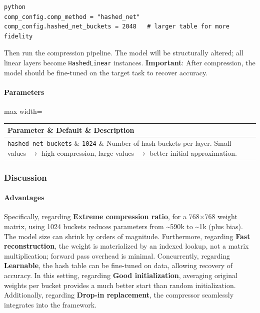 \vspace{0.5em}
\begin{mdframed}[backgroundcolor=codebg, linecolor=codeframe, linewidth=1pt, roundcorner=4pt, innerleftmargin=2pt, innerrightmargin=5pt, innertopmargin=5pt, innerbottommargin=5pt]
\begin{lstlisting}
python
comp_config.comp_method = "hashed_net"
comp_config.hashed_net_buckets = 2048   # larger table for more fidelity
\end{lstlisting}
\end{mdframed}
\vspace{0.5em}

Then run the compression pipeline. The model will be structurally altered; all linear layers become \texttt{HashedLinear} instances. \textbf{Important}: After compression, the model should be fine-tuned on the target task to recover accuracy.

\paragraph{Parameters}

\begin{center}
\begin{adjustbox}{max width=\columnwidth}
\renewcommand{\arraystretch}{1.2}
\begin{tabular}{lll}
\toprule
Parameter \& Default \& Description \\
\midrule
\texttt{hashed\_net\_buckets} \& \texttt{1024} \& Number of hash buckets per layer. Small values $\rightarrow$ high compression, large values $\rightarrow$ better initial approximation. \\

\bottomrule
\end{tabular}
\end{adjustbox}
\end{center}

\subsubsection*{Discussion}

\paragraph{Advantages}

Specifically, regarding \textbf{Extreme compression ratio}, for a 768$\times$768 weight matrix, using 1024 buckets reduces parameters from \textasciitilde{}590k to \textasciitilde{}1k (plus bias). The model size can shrink by orders of magnitude. Furthermore, regarding \textbf{Fast reconstruction}, the weight is materialized by an indexed lookup, not a matrix multiplication; forward pass overhead is minimal. Concurrently, regarding \textbf{Learnable}, the hash table can be fine-tuned on data, allowing recovery of accuracy. In this setting, regarding \textbf{Good initialization}, averaging original weights per bucket provides a much better start than random initialization. Additionally, regarding \textbf{Drop-in replacement}, the compressor seamlessly integrates into the framework.


